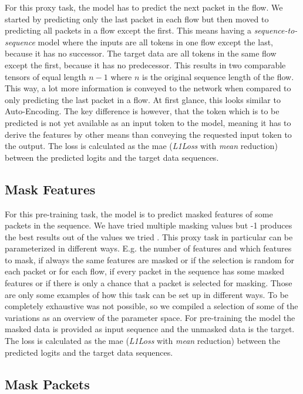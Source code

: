 For this proxy task, the model has to predict the next packet in the flow. We started by predicting only the last packet in each flow but then moved to predicting all packets in a flow except the first. This means having a \textit{sequence-to-sequence} model where the inputs are all tokens in one flow except the last, because it has no successor. The target data are all tokens in the same flow except the first, because it has no predecessor. This results in two comparable tensors of equal length $n-1$ where $n$ is the original sequence length of the flow. This way, a lot more information is conveyed to the network when compared to only predicting the last packet in a flow. At first glance, this looks similar to Auto-Encoding. The key difference is however, that the token which is to be predicted is not yet available as an input token to the model, meaning it has to derive the features by other means than conveying the requested input token to the output. The loss is calculated as the \gls{mae} (\textit{L1Loss} with \textit{mean} reduction) between the predicted logits and the target data sequences.

\subsection{Mask Features} \label{sec:experiments_lstm_mask_feature}

For this pre-training task, the model is to predict masked features of some packets in the sequence. We have tried multiple masking values but -1 produces the best results out of the values we tried . This proxy task in particular can be parameterized in different ways. E.g. the number of features and which features to mask, if always the same features are masked or if the selection is random for each packet or for each flow, if every packet in the sequence has some masked features or if there is only a chance that a packet is selected for masking. Those are only some examples of how this task can be set up in different ways. To be completely exhaustive was not possible, so we compiled a selection of some of the variations as an overview of the parameter space. For pre-training the model the masked data is provided as input sequence and the unmasked data is the target. The loss is calculated as the \gls{mae} (\textit{L1Loss} with \textit{mean} reduction) between the predicted logits and the target data sequences. 

\subsection{Mask Packets} \label{sec:experiments_lstm_mask_packet}


